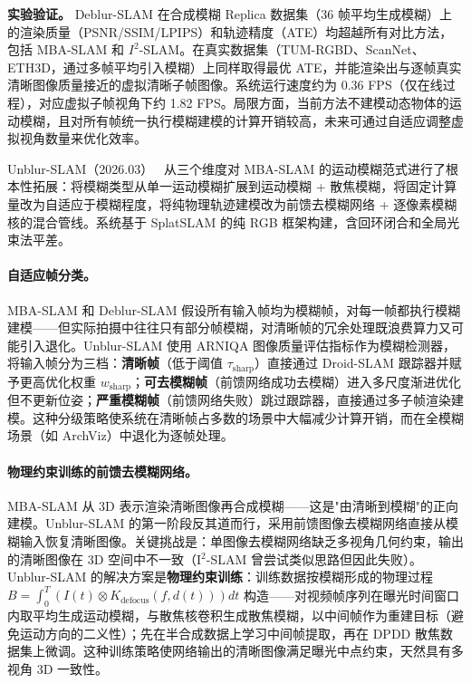 \textbf{实验验证。}
Deblur-SLAM 在合成模糊 Replica 数据集（36 帧平均生成模糊）上的渲染质量（PSNR/SSIM/LPIPS）和轨迹精度（ATE）均超越所有对比方法，包括 MBA-SLAM 和 $I^2$-SLAM。在真实数据集（TUM-RGBD、ScanNet、ETH3D，通过多帧平均引入模糊）上同样取得最优 ATE，并能渲染出与逐帧真实清晰图像质量接近的虚拟清晰子帧图像。系统运行速度约为 0.36 FPS（仅在线过程），对应虚拟子帧视角下约 1.82 FPS。局限方面，当前方法不建模动态物体的运动模糊，且对所有帧统一执行模糊建模的计算开销较高，未来可通过自适应调整虚拟视角数量来优化效率。

Unblur-SLAM（2026.03）~\cite{2603_26810} 从三个维度对 MBA-SLAM 的运动模糊范式进行了根本性拓展：将模糊类型从单一运动模糊扩展到运动模糊 + 散焦模糊，将固定计算量改为自适应于模糊程度，将纯物理轨迹建模改为前馈去模糊网络 + 逐像素模糊核的混合管线。系统基于 SplatSLAM 的纯 RGB 框架构建，含回环闭合和全局光束法平差。

\paragraph{自适应帧分类。}
MBA-SLAM 和 Deblur-SLAM 假设所有输入帧均为模糊帧，对每一帧都执行模糊建模——但实际拍摄中往往只有部分帧模糊，对清晰帧的冗余处理既浪费算力又可能引入退化。Unblur-SLAM 使用 ARNIQA 图像质量评估指标作为模糊检测器，将输入帧分为三档：\textbf{清晰帧}（低于阈值 $\tau_\text{sharp}$）直接通过 Droid-SLAM 跟踪器并赋予更高优化权重 $w_\text{sharp}$；\textbf{可去模糊帧}（前馈网络成功去模糊）进入多尺度渐进优化但不更新位姿；\textbf{严重模糊帧}（前馈网络失败）跳过跟踪器，直接通过多子帧渲染建模。这种分级策略使系统在清晰帧占多数的场景中大幅减少计算开销，而在全模糊场景（如 ArchViz）中退化为逐帧处理。

\paragraph{物理约束训练的前馈去模糊网络。}
MBA-SLAM 从 3D 表示渲染清晰图像再合成模糊——这是"由清晰到模糊"的正向建模。Unblur-SLAM 的第一阶段反其道而行，采用前馈图像去模糊网络直接从模糊输入恢复清晰图像。关键挑战是：单图像去模糊网络缺乏多视角几何约束，输出的清晰图像在 3D 空间中不一致（I$^2$-SLAM 曾尝试类似思路但因此失败）。Unblur-SLAM 的解决方案是\textbf{物理约束训练}：训练数据按模糊形成的物理过程 $B = \int_0^T(I(t) \otimes K_\text{defocus}(f, d(t))) dt$ 构造——对视频帧序列在曝光时间窗口内取平均生成运动模糊，与散焦核卷积生成散焦模糊，以中间帧作为重建目标（避免运动方向的二义性）；先在半合成数据上学习中间帧提取，再在 DPDD 散焦数据集上微调。这种训练策略使网络输出的清晰图像满足曝光中点约束，天然具有多视角 3D 一致性。


